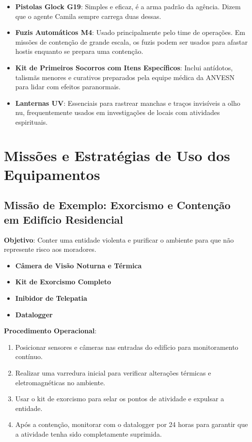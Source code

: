 \documentclass{book}
\begin{document}
\begin{itemize}
    \item \textbf{Pistolas Glock G19}: Simples e eficaz, é a arma padrão da agência. Dizem que o agente Camila sempre carrega duas dessas.

    \item \textbf{Fuzis Automáticos M4}: Usado principalmente pelo time de operações. Em missões de contenção de grande escala, os fuzis podem ser usados para afastar hostis enquanto se prepara uma contenção.

    \item \textbf{Kit de Primeiros Socorros com Itens Específicos}: Inclui antídotos, talismãs menores e curativos preparados pela equipe médica da ANVESN para lidar com efeitos paranormais.

    \item \textbf{Lanternas UV}: Essenciais para rastrear manchas e traços invisíveis a olho nu, frequentemente usados em investigações de locais com atividades espirituais.
\end{itemize}

\chapter{Missões e Estratégias de Uso dos Equipamentos}
\section{Missão de Exemplo: Exorcismo e Contenção em Edifício Residencial}
\textbf{Objetivo}: Conter uma entidade violenta e purificar o ambiente para que não represente risco aos moradores.

\begin{itemize}
    \item \textbf{Câmera de Visão Noturna e Térmica}
    \item \textbf{Kit de Exorcismo Completo}
    \item \textbf{Inibidor de Telepatia}
    \item \textbf{Datalogger}
\end{itemize}

\textbf{Procedimento Operacional}:
\begin{enumerate}
    \item Posicionar sensores e câmeras nas entradas do edifício para monitoramento contínuo.
    \item Realizar uma varredura inicial para verificar alterações térmicas e eletromagnéticas no ambiente.
    \item Usar o kit de exorcismo para selar os pontos de atividade e expulsar a entidade.
    \item Após a contenção, monitorar com o datalogger por 24 horas para garantir que a atividade tenha sido completamente suprimida.
\end{enumerate}
\end{document}

